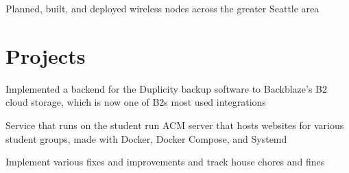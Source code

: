 \documentclass[letterpaper]{deedy-resume} %
\begin{document}
\begin{minipage}[t]{0.66\textwidth}
\sectionspace %



\begin{tightitemize}
\item Planned, built, and deployed wireless nodes across the greater Seattle
  area
\end{tightitemize}

\sectionspace %


\section{Projects}


\begin{tightitemize}
\item Implemented a backend for the Duplicity backup software to Backblaze's B2
  cloud storage, which is now one of B2s most used integrations
\end{tightitemize}

\sectionspace %



\begin{tightitemize}
\item Service that runs on the student run ACM server that hosts websites for
  various student groups, made with Docker, Docker Compose, and Systemd
\end{tightitemize}

\sectionspace %



\begin{tightitemize}
\item Implement various fixes and improvements and track house chores and fines
\end{tightitemize}


\end{minipage}
\end{document}
